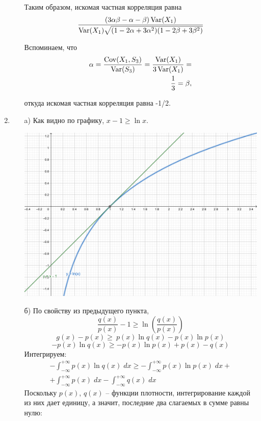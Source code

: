 \begin{enumerate}
\begin{enumerate}
Таким образом, искомая частная корреляция равна
\[\frac{(3\alpha\beta-\alpha-\beta)\operatorname{Var}(X_1)}{\operatorname{Var}(X_1)\sqrt{(1-2\alpha+3\alpha^2)(1-2\beta+3\beta^2)}}\]

Вспоминаем, что 
\begin{align*}\alpha=\frac{\operatorname{Cov}(X_1,S_3)}{\operatorname{Var}(S_3)}=\frac{\operatorname{Var}(X_1)}{3\operatorname{Var}(X_1)}=\\ \frac{1}{3}=\beta,\end{align*}

откуда искомая частная корреляция равна -1/2.
\end{enumerate}
\item 
\begin{enumerate}
\item[a)] Как видно по графику, $x-1\geq \ln x$.
\begin{minipage}{0.6\textwidth}
\begin{center}
\includegraphics[scale=0.5]{images/sol_kr_3_ip.png}
\end{center}
\end{minipage}
\item[б)] По свойству из предыдущего пункта, 
\[\frac{q(x)}{p(x)}-1\geq\ln \left(\frac{q(x)}{p(x)}\right)\]
\[g(x)-p(x)\geq\ p(x)\ln q(x)-p(x)\ln p(x)\]
\[-p(x)\ln q(x)\geq -p(x)\ln p(x)+p(x)-q(x)\]
Интегрируем:
\begin{align*}-\int^{+\infty}_{-\infty}p(x)\ln q(x) \; dx \geq -\int^{+\infty}_{-\infty}p(x)\ln p(x) \; dx +\\+ \int^{+\infty}_{-\infty}p(x) \; dx - \int^{+\infty}_{-\infty}q(x) \; dx\end{align*}
Поскольку $p(x)$, $q(x)$ – функции плотности, интегрирование каждой из них дает единицу, а значит, последние два слагаемых в сумме равны нулю:

\end{enumerate}
\end{enumerate}
